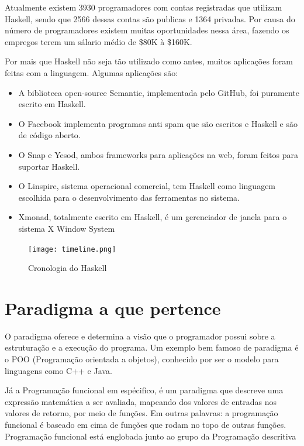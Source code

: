 \documentclass[
  12pt,				         %
  oneside,			       %
  a4paper,			       %
  english,		       	 %
  brazil,			      	 %
]{abntex2}
\begin{document}
    Atualmente existem 3930 programadores com contas registradas que utilizam Haskell, sendo que 2566
    dessas contas são publicas e 1364 privadas. Por causa do número de programadores existem muitas 
    oportunidades nessa área, fazendo os empregos terem um sálario médio de \$80K à \$160K.

    Por mais que Haskell não seja tão utilizado como antes, muitos aplicações foram feitas com a linguagem. 
    Algumas aplicações são:

    \begin{itemize}
      \item A biblioteca open-source Semantic, implementada pelo GitHub, foi puramente escrito em Haskell.
      \item O Facebook implementa programas anti spam que são escritos e Haskell e são de código aberto.
      \item O Snap e Yesod, ambos frameworks para aplicações na web, foram feitos para suportar Haskell.
      \item O Linspire, sistema operacional comercial, tem Haskell como linguagem escolhida para o desenvolvimento das ferramentas no sistema.
      \item Xmonad, totalmente escrito em Haskell, é um gerenciador de janela para o sistema X Window System
    \end{itemize}

    \begin{figure}[ht]
      \texttt{[image: timeline.png]}
      \caption{Cronologia do Haskell}
    \end{figure}

    \nocite{haskellmicrosoft}
    \nocite{haskellreport2010}
    \nocite{haskelljobs}
    \nocite{haskellers}

    \newpage

    \chapter{Paradigma a que pertence}

    O paradigma oferece e determina a visão que o programador possui sobre a estruturação
    e a execução do programa. Um exemplo bem famoso de paradigma é o POO (Programação orientada a objetos),
    conhecido por ser o modelo para linguagens como C++ e Java.

    Já a Programação funcional em espécifico, é um paradigma que descreve uma expressão matemática a ser avaliada,
    mapeando dos valores de entradas nos valores de retorno, por meio de funções. Em outras palavras: 
    a programação funcional é baseado em cima de funções que rodam no topo de outras funções. Programação 
    funcional está englobada junto ao grupo da Programação descritiva
\end{document}
